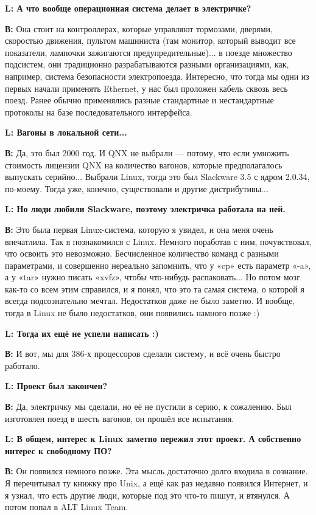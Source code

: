 \documentclass[10pt, a5paper]{article}
\begin{document}
{\noindent \bf L: А что вообще операционная система делает в электричке?}

{\noindent \bf В:} Она стоит на контроллерах, которые управляют тормозами, дверями, скоростью движения,  пультом машиниста (там монитор, который выводит все показатели, лампочки зажигаются предупредительные)... в поезде множество подсистем, они традиционно разрабатываются разными организациями, как, например, система безопасности электропоезда. Интересно, что тогда мы одни из первых начали применять Ethernet, у нас был проложен кабель сквозь весь поезд. Ранее обычно применялись разные стандартные и нестандартные протоколы на базе последовательного интерфейса.

{\noindent \bf L: Вагоны в локальной сети...}

{\noindent \bf В:} Да, это был 2000 год. И QNX не выбрали --- потому, что если умножить стоимость лицензии QNX на количество вагонов, которые предполагалось выпускать серийно... Выбрали Linux, тогда это был Slackware 3.5 с ядром 2.0.34, по-моему. Тогда уже, конечно, существовали и другие дистрибутивы...

{\noindent \bf L: Но люди любили Slackware, поэтому электричка работала на ней.}

{\noindent \bf В:} Это была первая Linux-система, которую я увидел, и она меня очень впечатлила. Так я познакомился с Linux. Немного поработав с ним, почувствовал, что освоить это невозможно. Бесчисленное количество команд с разными параметрами, и совершенно нереально запомнить, что у «cp»  есть параметр «-a», а у «tar» нужно писать «xvfz», чтобы что-нибудь распаковать... Но потом мозг как-то со всем этим справился, и я понял, что это та самая система, о которой я всегда подсознательно мечтал. Недостатков даже не было заметно. И вообще, тогда в Linux не было недостатков, они появились намного позже :)

{\noindent \bf L: Тогда их ещё не успели написать :)}

{\noindent \bf В:} И вот, мы для 386-х процессоров сделали систему, и всё очень быстро работало.

{\noindent \bf L: Проект был закончен?}

{\noindent \bf В:} Да, электричку мы сделали, но её не пустили в серию, к сожалению. Был изготовлен поезд в шесть вагонов, он прошёл все испытания.

{\noindent \bf L: В общем, интерес к Linux заметно пережил этот проект. А собственно интерес к свободному ПО?}

{\noindent \bf В:} Он появился немного позже. Эта мысль достаточно долго входила в сознание. Я перечитывал ту книжку про Unix, а ещё как раз недавно появился Интернет, и я узнал, что есть другие люди, которые под это что-то пишут, и втянулся. А потом попал в ALT Linux Team.
\end{document}
